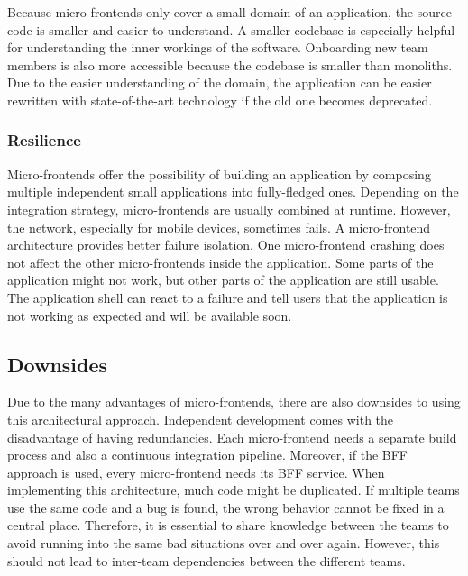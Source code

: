 Because micro-frontends only cover a small domain of an application, the source code is smaller and easier to understand. A smaller codebase is especially helpful for understanding the inner workings of the software. Onboarding new team members is also more accessible because the codebase is smaller than monoliths.
Due to the easier understanding of the domain, the application can be easier rewritten with state-of-the-art technology if the old one becomes deprecated. \cite{book:2020:geers:background:micro-frontends:micro-frontends-in-action}

\subsubsection{Resilience}\label{subsubsection:background:micro-frontend-resilience}

Micro-frontends offer the possibility of building an application by composing multiple independent small applications into fully-fledged ones. Depending on the integration strategy, micro-frontends are usually combined at runtime. However, the network, especially for mobile devices, sometimes fails. A micro-frontend architecture provides better failure isolation. One micro-frontend crashing does not affect the other micro-frontends inside the application. Some parts of the application might not work, but other parts of the application are still usable. The application shell can react to a failure and tell users that the application is not working as expected and will be available soon. \cite[10-11]{article:2021:perltonen:background:micro-frontends:motivations-benefits-and-issues}

\subsection{Downsides}\label{subsection:background:micro-frontend-downsides}

Due to the many advantages of micro-frontends, there are also downsides to using this architectural approach. Independent development comes with the disadvantage of having redundancies. Each micro-frontend needs a separate build process and also a continuous integration pipeline. Moreover, if the \ac{BFF} approach is used, every micro-frontend needs its \ac{BFF} service. When implementing this architecture, much code might be duplicated. If multiple teams use the same code and a bug is found, the wrong behavior cannot be fixed in a central place. Therefore, it is essential to share knowledge between the teams to avoid running into the same bad situations over and over again. However, this should not lead to inter-team dependencies between the different teams. \cite[17-18]{book:2020:geers:background:micro-frontends:micro-frontends-in-action}









